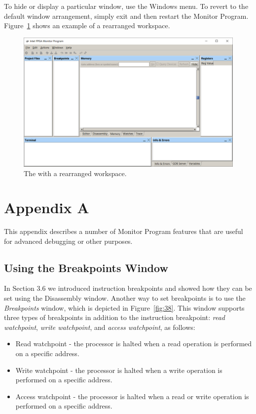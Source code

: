 \documentclass[11pt, twoside, pdftex]{article}
\begin{document}
To hide or display a particular window, use the {\sf Windows}
menu. To revert to the default window arrangement, simply exit
and then restart the Monitor Program. Figure~\ref{fig:37} shows an example
of a rearranged workspace.

\begin{figure}[H]
   \begin{center}
      \includegraphics[scale=0.55]{screenshots/figure37.png}
   \end{center}
   \caption{The \productNameMed{} with a rearranged workspace.} 
	 \label{fig:37}
\end{figure}


\newpage
\section{Appendix A}

This appendix describes a number of Monitor Program features that
are useful for advanced debugging or other purposes.

\subsection{Using the Breakpoints Window}

In Section 3.6 we introduced instruction breakpoints and showed
how they can be set using the Disassembly window. Another way to
set breakpoints is to use the {\it Breakpoints} window, which is
depicted in Figure~\ref{fig:38}. This window supports three 
types of breakpoints in addition to the instruction breakpoint:
{\it read watchpoint}, {\it write watchpoint}, and 
{\it access watchpoint}, as follows:

\begin{itemize}
\item Read watchpoint - the processor is halted when a read
operation is performed on a specific address.
\item Write watchpoint - the processor is halted when a write
operation is performed on a specific address.
\item Access watchpoint - the processor is halted when a read or
write operation is performed on a specific address.
\end{itemize}
\end{document}
